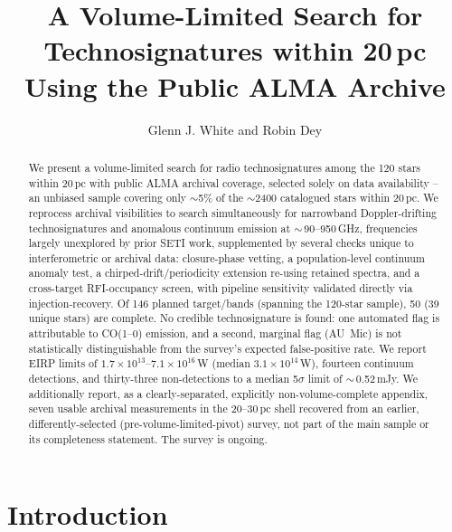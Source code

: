 \documentclass{openjournal}
\begin{document}
\title{A Volume-Limited Search for Technosignatures within 20\,pc Using the Public ALMA Archive}

\author{Glenn J. White and Robin Dey}

\begin{abstract}
We present a volume-limited search for radio technosignatures among the
120 stars within 20\,pc with public ALMA archival coverage, selected
solely on data availability -- an unbiased sample covering only
$\sim$5\% of the $\sim$2400 catalogued stars within 20\,pc. We reprocess
archival visibilities to search simultaneously for narrowband
Doppler-drifting technosignatures and anomalous continuum emission at
$\sim$\,90--950\,GHz, frequencies largely unexplored by prior SETI work,
supplemented by several checks unique to interferometric or archival
data: closure-phase vetting, a population-level continuum anomaly test,
a chirped-drift/periodicity extension re-using retained spectra, and a
cross-target RFI-occupancy screen, with pipeline sensitivity validated
directly via injection-recovery. Of 146 planned target/bands (spanning
the 120-star sample), 50 (39 unique stars) are complete. No
credible technosignature is found: one automated flag is attributable to
CO(1--0) emission, and a second, marginal flag (AU~Mic) is not
statistically distinguishable from the survey's expected false-positive
rate. We report EIRP limits of
$1.7\times10^{13}$--$7.1\times10^{16}$\,W (median $3.1\times10^{14}$\,W),
fourteen continuum detections, and thirty-three non-detections to a median
5$\sigma$ limit of $\sim$\,0.52\,mJy. We additionally report, as a
clearly-separated, explicitly non-volume-complete appendix, seven usable
archival measurements in the 20--30\,pc shell recovered from an earlier,
differently-selected (pre-volume-limited-pivot) survey, not part of the
main sample or its completeness statement. The survey is ongoing.
\end{abstract}


\section{Introduction}
\label{sec:intro}
\end{document}
